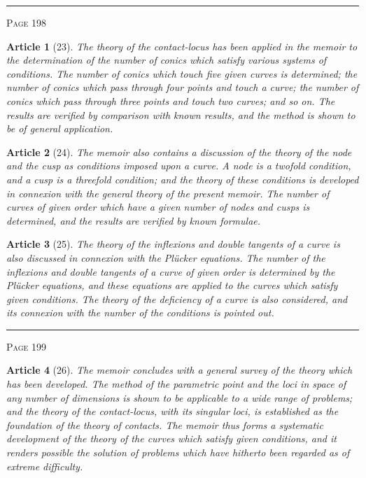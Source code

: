 \documentclass[11pt,a4paper]{article}
\theoremstyle{cayley}
\newtheorem{art}{Article}
\begin{document}
\vspace{1em}
\noindent\rule{\textwidth}{0.4pt}
\begin{center}\textsc{Page 198}\end{center}
\newpage

\begin{art}[23]
The theory of the contact-locus has been applied in the memoir to the determination of the number of conics which satisfy various systems of conditions. The number of conics which touch five given curves is determined; the number of conics which pass through four points and touch a curve; the number of conics which pass through three points and touch two curves; and so on. The results are verified by comparison with known results, and the method is shown to be of general application.
\end{art}

\begin{art}[24]
The memoir also contains a discussion of the theory of the node and the cusp as conditions imposed upon a curve. A node is a twofold condition, and a cusp is a threefold condition; and the theory of these conditions is developed in connexion with the general theory of the present memoir. The number of curves of given order which have a given number of nodes and cusps is determined, and the results are verified by known formulae.
\end{art}

\begin{art}[25]
The theory of the inflexions and double tangents of a curve is also discussed in connexion with the Pl\"ucker equations. The number of the inflexions and double tangents of a curve of given order is determined by the Pl\"ucker equations, and these equations are applied to the curves which satisfy given conditions. The theory of the deficiency of a curve is also considered, and its connexion with the number of the conditions is pointed out.
\end{art}

\vspace{1em}
\noindent\rule{\textwidth}{0.4pt}
\begin{center}\textsc{Page 199}\end{center}
\newpage

\begin{art}[26]
The memoir concludes with a general survey of the theory which has been developed. The method of the parametric point and the loci in space of any number of dimensions is shown to be applicable to a wide range of problems; and the theory of the contact-locus, with its singular loci, is established as the foundation of the theory of contacts. The memoir thus forms a systematic development of the theory of the curves which satisfy given conditions, and it renders possible the solution of problems which have hitherto been regarded as of extreme difficulty.
\end{art}
\end{document}
